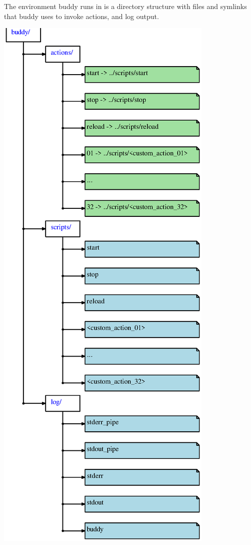 The environment buddy runs in is a directory structure with files and symlinks that buddy uses to invoke actions, and log output. \begin{center}

\begin{DoxyImageNoCaption}
  \mbox{\includegraphics[width=\textwidth]{dot_inline_dotgraph_2}}
\end{DoxyImageNoCaption}
\end{center}


